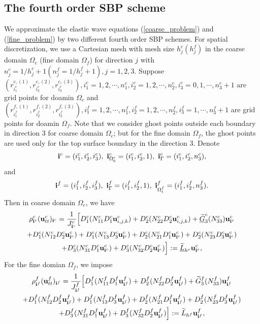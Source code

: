 \documentclass[a4paper]{article}
\newcommand{\wt}{\widetilde}
\begin{document}
\subsection{The fourth order SBP scheme}\label{sub_section_4_1}
We approximate the elastic wave equations (\ref{coarse_problem}) and (\ref{fine_problem}) by two different fourth order SBP schemes. For spatial discretization, we use a Cartesian mesh with mesh size $h_j^c (h_j^f)$ in the coarse domain $\Omega_c$ (fine domain $\Omega_f$) for direction $j$ with $n_j^c = 1/h_j^c +1 (n_j^f = 1/h_j^f +1), j = 1,2,3$. Suppose $(r^{c,(1)}_{i_1^c}, r^{c,(2)}_{i_2^c}, r^{c,(3)}_{i_3^c}), i_1^c = 1,2,\cdots,n_1^c, i_2^c = 1,2,\cdots,n_2^c,i_3^c=0,1,\cdots,n_3^c+1$ are grid points for doamin $\Omega_c$ and   $(r^{f,(1)}_{i_1^f}, r^{f,(2)}_{i_2^f}, r^{f,(3)}_{i_3^f}), i_1^f = 1,2,\cdots,n_1^f, i_2^f = 1,2,\cdots,n_2^f,i_3^f=1,\cdots,n_3^f+1$ are grid points for doamin $\Omega_f$. Note that we consider ghost points outside each boundary in direction $3$ for coarse domain $\Omega_c$; but for the fine domain $\Omega_f$, the ghost points are used only for the top surface boundary in the direction $3$. Denote 
\[{\bf i}^c = (i_1^c,i_2^c,i_3^c), \ {\bf i}^c_{\Omega^c_b} = (i_1^c,i_2^c,1),\  {\bf i}^c_{\Gamma} = (i_1^c,i_2^c,n_3^c),\]
and
\[ {\bf i}^f = (i_1^f,i_2^f,i_3^f), \ {\bf i}^f_{\Gamma} = (i_1^f,i_2^f,1), \ {\bf i}^f_{\Omega_t^f} = (i_1^f,i_2^f,n_3^f).\]
 Then in coarse domain $\Omega_c$, we have
\begin{multline}\label{coarse_scheme}
\rho_{{\bf i}^c}^c ({\bf u}_{tt}^c)_{{\bf i}^c} = \frac{1}{J_{{\bf i}^c}^c}\Big[D_1^c(N_{11}^cD_1^c{\bf u}_{i,j,k}^c)+D_2^c(N_{22}^cD_2^c{\bf u}_{i,j,k}^c)+\uline{\wt{G}}_3^c(N_{33}^c){\bf u}_{{\bf i}^c}^c\\
+D_1^c(N_{12}^cD_2^c{\bf u}_{{\bf i}^c}^c)+D_1^c(N_{13}^cD_3^c{\bf u}_{{\bf i}^c}^c)
+D_2^c(N_{21}^cD_1^c{\bf u}_{{\bf i}^c}^c)+D_2^c(N_{23}^cD_3^c{\bf u}_{{\bf i}^c}^c)\\
+D_3^c(N_{31}^cD_1^c{\bf u}_{{\bf i}^c}^c)
+D_3^c(N_{32}^cD_2^c{\bf u}_{{\bf i}^c}^c)\Big] := \uline{\wt{L}}_{h^c} {\bf{u}}^c_{{\bf i}^c},
\end{multline}
 For the fine domian $\Omega_f$, we impose
\begin{multline}\label{fine_scheme_2}
\rho_{{\bf i}^f}^f ({\bf u}_{tt}^f)_{{\bf i}^f} =
 \frac{1}{J_{{\bf i}^f}^f}\Big[D_1^f(N_{11}^fD_1^f{\bf u}_{{\bf i}^f}^f)+D_2^f(N_{22}^fD_2^f{\bf u}_{{\bf i}^f}^f)+\wt{G}_3^f(N_{33}^f){\bf u}_{{\bf i}^f}^f\\
+D_1^f(N_{12}^fD_2^f{\bf u}_{{\bf i}^f}^f)+D_1^f(N_{13}^fD_3^f{\bf u}_{{\bf i}^f}^f)
+D_2^f(N_{21}^fD_1^f{\bf u}_{{\bf i}^f}^f)+D_2^f(N_{23}^fD_3^f{\bf u}_{{\bf i}^f}^f)\\
+D_3^f(N_{31}^fD_1^f{\bf u}_{{\bf i}^f}^f)+D_3^f(N_{32}^fD_2^f{\bf u}_{{\bf i}^f}^f)\Big] 
:= \wt{L}_{h^f}{\bf{u}}^f_{{\bf i}^f},
\end{multline}
\end{document}
